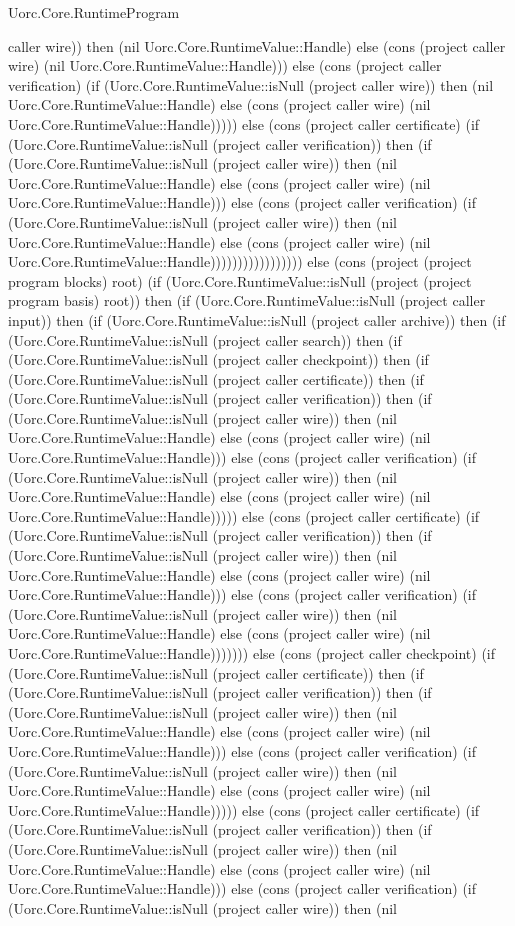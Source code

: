 \begin{lexlean}{Uorc.Core.RuntimeProgram}
\begin{semanticmodule}
{caller wire)) then (nil Uorc.Core.RuntimeValue::Handle) else (cons (project caller wire) (nil Uorc.Core.RuntimeValue::Handle))) else (cons (project caller verification) (if (Uorc.Core.RuntimeValue::isNull (project caller wire)) then (nil Uorc.Core.RuntimeValue::Handle) else (cons (project caller wire) (nil Uorc.Core.RuntimeValue::Handle))))) else (cons (project caller certificate) (if (Uorc.Core.RuntimeValue::isNull (project caller verification)) then (if (Uorc.Core.RuntimeValue::isNull (project caller wire)) then (nil Uorc.Core.RuntimeValue::Handle) else (cons (project caller wire) (nil Uorc.Core.RuntimeValue::Handle))) else (cons (project caller verification) (if (Uorc.Core.RuntimeValue::isNull (project caller wire)) then (nil Uorc.Core.RuntimeValue::Handle) else (cons (project caller wire) (nil Uorc.Core.RuntimeValue::Handle))))))))))))))))) else (cons (project (project program blocks) root) (if (Uorc.Core.RuntimeValue::isNull (project (project program basis) root)) then (if (Uorc.Core.RuntimeValue::isNull (project caller input)) then (if (Uorc.Core.RuntimeValue::isNull (project caller archive)) then (if (Uorc.Core.RuntimeValue::isNull (project caller search)) then (if (Uorc.Core.RuntimeValue::isNull (project caller checkpoint)) then (if (Uorc.Core.RuntimeValue::isNull (project caller certificate)) then (if (Uorc.Core.RuntimeValue::isNull (project caller verification)) then (if (Uorc.Core.RuntimeValue::isNull (project caller wire)) then (nil Uorc.Core.RuntimeValue::Handle) else (cons (project caller wire) (nil Uorc.Core.RuntimeValue::Handle))) else (cons (project caller verification) (if (Uorc.Core.RuntimeValue::isNull (project caller wire)) then (nil Uorc.Core.RuntimeValue::Handle) else (cons (project caller wire) (nil Uorc.Core.RuntimeValue::Handle))))) else (cons (project caller certificate) (if (Uorc.Core.RuntimeValue::isNull (project caller verification)) then (if (Uorc.Core.RuntimeValue::isNull (project caller wire)) then (nil Uorc.Core.RuntimeValue::Handle) else (cons (project caller wire) (nil Uorc.Core.RuntimeValue::Handle))) else (cons (project caller verification) (if (Uorc.Core.RuntimeValue::isNull (project caller wire)) then (nil Uorc.Core.RuntimeValue::Handle) else (cons (project caller wire) (nil Uorc.Core.RuntimeValue::Handle))))))) else (cons (project caller checkpoint) (if (Uorc.Core.RuntimeValue::isNull (project caller certificate)) then (if (Uorc.Core.RuntimeValue::isNull (project caller verification)) then (if (Uorc.Core.RuntimeValue::isNull (project caller wire)) then (nil Uorc.Core.RuntimeValue::Handle) else (cons (project caller wire) (nil Uorc.Core.RuntimeValue::Handle))) else (cons (project caller verification) (if (Uorc.Core.RuntimeValue::isNull (project caller wire)) then (nil Uorc.Core.RuntimeValue::Handle) else (cons (project caller wire) (nil Uorc.Core.RuntimeValue::Handle))))) else (cons (project caller certificate) (if (Uorc.Core.RuntimeValue::isNull (project caller verification)) then (if (Uorc.Core.RuntimeValue::isNull (project caller wire)) then (nil Uorc.Core.RuntimeValue::Handle) else (cons (project caller wire) (nil Uorc.Core.RuntimeValue::Handle))) else (cons (project caller verification) (if (Uorc.Core.RuntimeValue::isNull (project caller wire)) then (nil }
\end{semanticmodule}
\end{lexlean}

